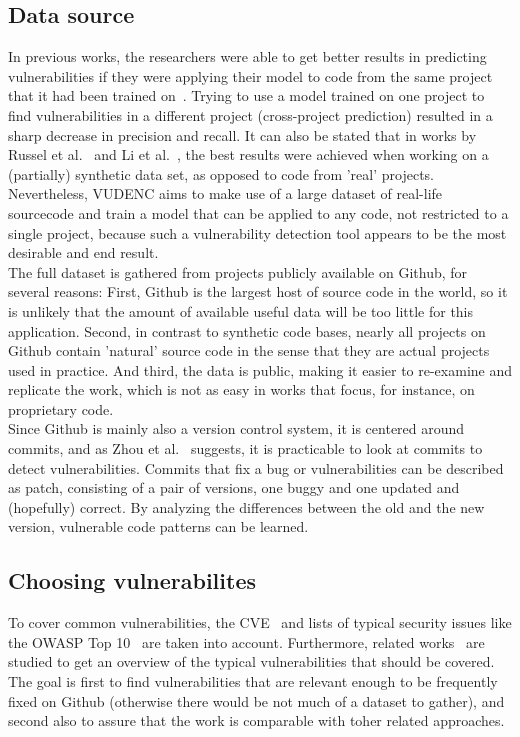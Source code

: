 \documentclass[
a4paper,
pagesize,
pdftex,
12pt,
twoside, %
BCOR=5mm, %
ngerman,
fleqn,
final,
]{scrartcl}
\begin{document}
	\subsection{Data source}
	In previous works, the researchers were able to get better results in predicting vulnerabilities if they were applying their model to code from the same project that it had been trained on~\cite{Pang.2015,Dam.2017}. Trying to use a model trained on one project to find vulnerabilities in a different project (cross-project prediction) resulted in a sharp decrease in precision and recall. It can also be stated that in works by Russel et al.~\cite{Russell.2018} and Li et al.~\cite{Li.2018}, the best results were achieved when working on a (partially) synthetic data set, as opposed to code from 'real' projects.\\
	Nevertheless, VUDENC aims to make use of a large dataset of real-life sourcecode and train a model that can be applied to any code, not restricted to a single project, because such a vulnerability detection tool appears to be the most desirable and end result.\\
	The full dataset is gathered from projects publicly available on Github, for several reasons: First, Github is the largest host of source code in the world, so it is unlikely that the amount of available useful data will be too little for this application. Second, in contrast to synthetic code bases, nearly all projects on Github contain 'natural' source code in the sense that they are actual projects used in practice. And third, the data is public, making it easier to re-examine and replicate the work, which is not as easy in works that focus, for instance, on proprietary code.\\
	Since Github is mainly also a version control system, it is centered around commits, and as Zhou et al.~\cite{Zhou.2017} suggests, it is practicable to look at commits to detect vulnerabilities. Commits that fix a bug or vulnerabilities can be described as patch, consisting of a pair of versions, one buggy and one updated and (hopefully) correct. By analyzing the differences between the old and the new version, vulnerable code patterns can be learned. \\
	
	\subsection{Choosing vulnerabilites}
	To cover common vulnerabilities, the CVE~\cite{CVE} and lists of typical security issues like the OWASP Top 10~\cite{OWASPFoundation.} are taken into account. Furthermore, related works~\cite{Zhou.2017,Medeiros.2014,Yamaguchi.2012} are studied to get an overview of the typical vulnerabilities that should be covered. The goal is first to find vulnerabilities that are relevant enough to be frequently fixed on Github (otherwise there would be not much of a dataset to gather), and second also to assure that the work is comparable with toher related approaches. 
	
\end{document}

